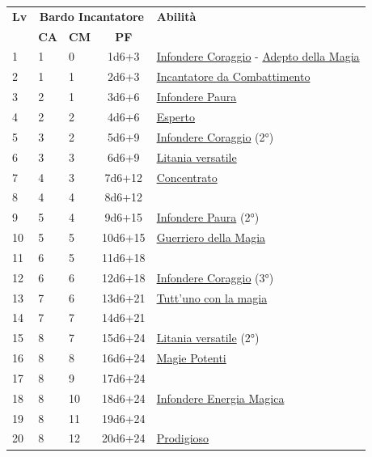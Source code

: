 {\begin{multicols}{2}

\noindent\begin{tabularx}{\linewidth}{p{0.3cm}|p{0.3cm}p{0.3cm}c|X|}
	\toprule
 \rowcolor{gray!20}	\textbf{Lv} & \multicolumn{3}{c|}{\textbf{Bardo Incantatore}} & \textbf{Abilità} \\
& \centering\arraybackslash \textbf{CA} & \centering\arraybackslash \textbf{CM} & \centering\arraybackslash \textbf{PF} & \\
	\toprule
	1 &1	& 0	&	1d6+3	&\hyperlink{Infondere Coraggio}{Infondere Coraggio} - \hyperlink{Adepto della Magia}{Adepto della Magia}\\
 \rowcolor{gray!20}2	&	1	& 1	&	2d6+3	&\hyperlink{Incantatore da Combattimento}{Incantatore da Combattimento}\\
	3	&	2	& 1	&	3d6+6	&\hyperlink{Infondere Paura}{Infondere Paura}\\
 \rowcolor{gray!20}4	&	2	& 2	&	4d6+6	&\hyperlink{Esperto}{Esperto}\\
	5	&	3	& 2	&	5d6+9	&\hyperlink{Infondere Coraggio}{Infondere Coraggio} (2°)\\
 \rowcolor{gray!20}6	&	3	& 3	&	6d6+9	&\hyperlink{Litania versatile}{Litania versatile}\\
	7	&	4	& 3	&	7d6+12	&\hyperlink{Concentrato}{Concentrato}\\
 \rowcolor{gray!20}8	&	4	& 4	&	8d6+12	&\\
	9	&	5	& 4	&	9d6+15	&\hyperlink{Infondere Paura}{Infondere Paura} (2°)\\
 \rowcolor{gray!20}10	&	5	& 5	&	10d6+15	&\hyperlink{Guerriero della Magia}{Guerriero della Magia}\\
	11	&	6	& 5	&	11d6+18	&\\
 \rowcolor{gray!20}12	&	6	& 6	&	12d6+18	&\hyperlink{Infondere Coraggio}{Infondere Coraggio} (3°)\\
	13	&	7	& 6	&	13d6+21	&\hyperlink{Tutt'uno con la magia}{Tutt'uno con la magia}\\
 \rowcolor{gray!20}14	&	7	& 7	&	14d6+21	&\\
	15	&	8	& 7	&	15d6+24	&\hyperlink{Litania versatile}{Litania versatile} (2°)\\
 \rowcolor{gray!20}16	&	8	& 8	&	16d6+24	&\hyperlink{Magie Potenti}{Magie Potenti}\\
	17	&	8	& 9	&	17d6+24	&\\
 \rowcolor{gray!20}18	&	8	& 10	&	18d6+24	&\hyperlink{Infondere Energia Magica}{Infondere Energia Magica}\\
	19	&	8	& 11	&	19d6+24	&\\
 \rowcolor{gray!20}20	&	8	& 12	&	20d6+24	&\hyperlink{Prodigioso}{Prodigioso}\\
\end{tabularx}


\end{multicols}}
